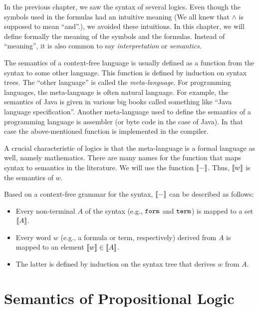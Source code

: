 In the previous chapter, we saw the syntax of several logics. Even though the symbols used in the formulas had an intuitive meaning (We all knew that $\wedge$ is supposed to mean ``and''.), we avoided these intuitions. In this chapter, we will define formally the meaning of the symbols and the formulas. Instead of ``meaning'', it is also common to say \emph{interpretation} or \emph{semantics}.
\medskip

The semantics of a context-free language is usually defined as a function from the syntax to some other language. This function is defined by induction on syntax trees. The ``other language'' is called the \emph{meta-language}. For programming languages, the meta-language is often natural language. For example, the semantics of Java is given in various big books called something like ``Java language specification''. Another meta-language used to define the semantics of a programming language is assembler (or byte code in the case of Java). In that case the above-mentioned function is implemented in the compiler.
\medskip

A crucial characteristic of logics is that the meta-language is a formal language as well, namely mathematics. There are many names for the function that maps syntax to semantics in the literature. We will use the function $\llbracket -\rrbracket$. Thus, $\llbracket w\rrbracket$ is the semantics of $w$.

Based on a context-free grammar for the syntax, $\llbracket -\rrbracket$ can be described as follows:
\begin{itemize}
\item Every non-terminal $A$ of the syntax (e.g., $\mathtt{form}$ and $\mathtt{term}$) is mapped to a set $\llbracket A\rrbracket$.
\item Every word $w$ (e.g., a formula or term, respectively) derived from $A$ is mapped to an element $\llbracket w\rrbracket\in\llbracket A\rrbracket$.
\item The latter is defined by induction on the syntax tree that derives $w$ from $A$.
\end{itemize}


\section{Semantics of Propositional Logic}

